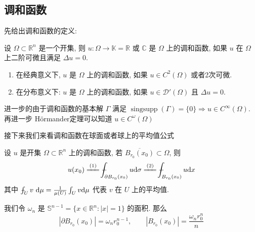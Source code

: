 \documentclass[11pt]{ctexart}[UTF8]
\begin{document}
\subsection{调和函数}
先给出调和函数的定义:
\begin{definition}[调和函数]
    设 $\Omega \subset \mathbb{R}^n$ 是一个开集, 则 $u: \Omega \longrightarrow \mathbb{K}=\mathbb{R}\text{ 或 } \mathbb{C}$ 是 $\Omega$ 上的调和函数, 如果 $u$ 在 $\Omega$ 上二阶可微且满足 $\Delta u = 0$.
\end{definition}
\begin{enumerate}
    \item 在经典意义下, $u$ 是 $\Omega$ 上的调和函数, 如果 $u \in C^2(\Omega)$ 或者2次可微.
    \item 在分布意义下: $u$ 是 $\Omega$ 上的调和函数, 如果 $u \in \mathscr{D}'(\Omega)$ 且 $\Delta u = 0$.
\end{enumerate}
进一步的由于调和函数的基本解 $\Gamma$ 满足 $\operatorname{singsupp}(\Gamma) = \{0\} \Longrightarrow u \in C^{\infty}(\Omega)$. 再进一步
H\"ormander定理可以知道 $u \in C^{\omega}(\Omega)$\par
接下来我们来看调和函数在球面或者球上的平均值公式
\begin{theorem}
    设 $u$ 是开集 $\Omega \subset \mathbb{R}^n$ 上的调和函数, 若 $\overline{B_{r_{0}}(x_{0})} \subset \Omega$, 则
    \begin{equation}
        u(x_{0}) \xlongequal{(1)}\averageint_{\partial B_{r_{0}}(x_{0})} u \mathrm{d}\sigma \xlongequal{(2)} \averageint_{B_{r_{0}}(x_{0})} u \mathrm{d}x
    \end{equation}
    其中 $\averageint_{U}v\  \mathrm{d}\mu = \frac{1}{\mu(U)} \int_{U} v \mathrm{d}\mu$ 代表 $v$ 在 $U$ 上的平均值.
\end{theorem}
我们令 $\omega_{n}$ 是 $\mathbb{S}^{n-1} = \{ x\in \mathbb{R}^{n} : |x| = 1 \}$ 的面积. 那么
\begin{equation*}
    |\partial B_{r_{0}}(x_{0})| = \omega_{n} r_{0}^{n-1},\quad\quad |B_{r_{0}}(x_{0})| = \frac{\omega_{n} r_{0}^{n}}{n}
\end{equation*}
\end{document}
